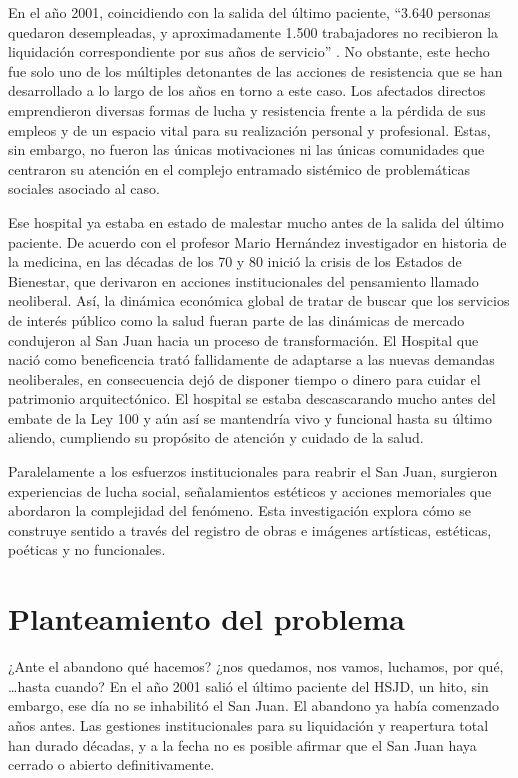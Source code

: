 En el año 2001, coincidiendo con la salida del último paciente, “3.640 personas quedaron desempleadas, y aproximadamente 1.500 trabajadores no recibieron la liquidación correspondiente por sus años de servicio” \parencite{Castiblanco2017}. No obstante, este hecho fue solo uno de los múltiples detonantes de las acciones de resistencia que se han desarrollado a lo largo de los años en torno a este caso. Los afectados directos emprendieron diversas formas de lucha y resistencia frente a la pérdida de sus empleos y de un espacio vital para su realización personal y profesional. Estas, sin embargo, no fueron las únicas motivaciones ni las únicas comunidades que centraron su atención en el complejo entramado sistémico de problemáticas sociales asociado al caso.

Ese hospital ya estaba en estado de malestar mucho antes de la salida del último paciente. De acuerdo con el profesor Mario Hernández investigador en historia de la medicina, en las décadas de los 70 y 80 inició la crisis de los Estados de Bienestar, que derivaron en acciones institucionales del pensamiento llamado neoliberal. Así, la dinámica económica global de tratar de buscar que los servicios de interés público como la salud fueran parte de las dinámicas de mercado condujeron al San Juan hacia un proceso de transformación. El Hospital que nació como beneficencia trató fallidamente de adaptarse a las nuevas demandas neoliberales, en consecuencia dejó de disponer tiempo o dinero para cuidar el patrimonio arquitectónico. El hospital se estaba descascarando mucho antes del embate de la Ley 100 y aún así se mantendría vivo y funcional hasta su último aliendo, cumpliendo su propósito de atención y cuidado de la salud.

Paralelamente a los esfuerzos institucionales para reabrir el San Juan, surgieron experiencias de lucha social, señalamientos estéticos y acciones memoriales que abordaron la complejidad del fenómeno. Esta investigación explora cómo se construye sentido a través del registro de obras e imágenes artísticas, estéticas, poéticas y no funcionales.

\section*{Planteamiento del problema }
¿Ante el abandono qué hacemos? ¿nos quedamos, nos vamos, luchamos, por qué, …hasta cuando? En el año 2001 salió el último paciente del HSJD, un hito, sin embargo, ese día no se inhabilitó el San Juan. El abandono ya había comenzado años antes. Las gestiones institucionales para su liquidación y reapertura total han durado décadas, y a la fecha no es posible afirmar que el San Juan haya cerrado o abierto definitivamente.

